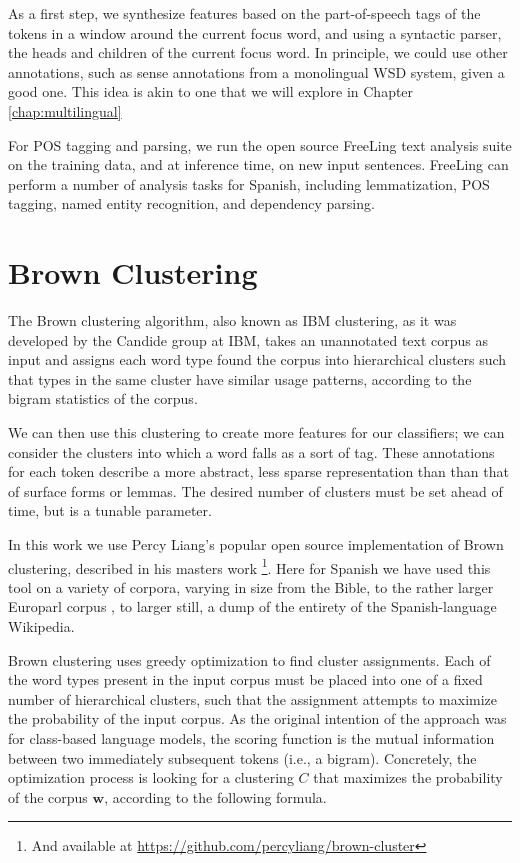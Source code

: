 As a first step, we synthesize features based on the part-of-speech tags of the
tokens in a window around the current focus word, and using a syntactic parser,
the heads and children of the current focus word.
In principle, we could use other annotations, such as sense annotations from a
monolingual WSD system, given a good one.
This idea is akin to one that we will explore in Chapter
\ref{chap:multilingual}

For POS tagging and parsing, we run the open source FreeLing text analysis
suite \cite{padro12} on the training data, and at inference time, on new input
sentences. FreeLing can perform a number of analysis tasks for Spanish,
including lemmatization, POS tagging, named entity recognition, and dependency
parsing.




\section{Brown Clustering}
The Brown clustering algorithm\cite{brown1992class}, also known as IBM
clustering, as it was developed by the Candide group at IBM, takes an
unannotated text corpus as input and assigns each word type found the corpus
into hierarchical clusters such that types in the same cluster have similar
usage patterns, according to the bigram statistics of the corpus.

We can then use this clustering to create more features for our classifiers; we
can consider the clusters into which a word falls as a sort of tag.  These
annotations for each token describe a more abstract, less sparse representation
than than that of surface forms or lemmas. The desired number of clusters must
be set ahead of time, but is a tunable parameter.

In this work we use Percy Liang's popular open source implementation of Brown
clustering, described in his masters work \cite{Liang05semi-supervisedlearning}
\footnote{And available at \url{https://github.com/percyliang/brown-cluster}}.
Here for Spanish we have used this tool on a variety of corpora, varying in
size from the Bible, to the rather larger Europarl corpus \cite{europarl}, to
larger still, a dump of the entirety of the Spanish-language Wikipedia.

Brown clustering uses greedy optimization to find cluster assignments. Each of
the word types present in the input corpus must be placed into one of a fixed
number of hierarchical clusters, such that the assignment attempts to maximize
the probability of the input corpus.  As the original intention of the approach
was for class-based language models, the scoring function is the mutual
information between two immediately subsequent tokens (i.e., a bigram).
Concretely, the optimization process is looking for a clustering $C$ that
maximizes the probability of the corpus $\boldsymbol{w}$, according to the
following formula.

